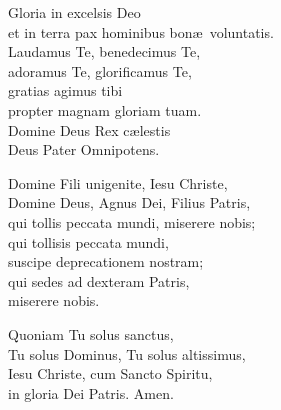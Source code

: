 
Gloria in excelsis Deo\\
et in terra pax hominibus bon\ae\ voluntatis.\\
Laudamus Te, benedecimus Te,\\
adoramus Te, glorificamus Te,\\
gratias agimus tibi\\
propter magnam gloriam tuam.\\
Domine Deus Rex c\ae lestis\\
Deus Pater Omnipotens.

\spazio

Domine Fili unigenite, Iesu Christe,\\
Domine Deus, Agnus Dei, Filius Patris,\\
qui tollis peccata mundi, miserere nobis;\\
qui tollisis peccata mundi,\\
suscipe deprecationem nostram;\\
qui sedes ad dexteram Patris,\\
miserere nobis.

\spazio

Quoniam Tu solus sanctus,\\
Tu solus Dominus, Tu solus altissimus,\\
Iesu Christe, cum Sancto Spiritu,\\
in gloria Dei Patris. Amen.